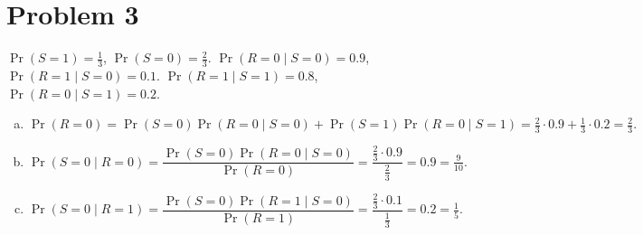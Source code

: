\section*{Problem 3}

\(\Pr(S=1)=\tfrac13\), \(\Pr(S=0)=\tfrac23\).
\(\Pr(R=0\mid S=0)=0.9\), \(\Pr(R=1\mid S=0)=0.1\).
\(\Pr(R=1\mid S=1)=0.8\), \(\Pr(R=0\mid S=1)=0.2\).

\begin{enumerate}[(a)]
\item
\[
\Pr(R=0)=\Pr(S=0)\Pr(R=0\mid S=0)+\Pr(S=1)\Pr(R=0\mid S=1)
=\tfrac23\cdot 0.9+\tfrac13\cdot 0.2=\tfrac23.
\]

\item
\[
\Pr(S=0\mid R=0)=\frac{\Pr(S=0)\Pr(R=0\mid S=0)}{\Pr(R=0)}
=\frac{\tfrac23\cdot 0.9}{\tfrac23}=0.9=\tfrac{9}{10}.
\]

\item
\[
\Pr(S=0\mid R=1)=\frac{\Pr(S=0)\Pr(R=1\mid S=0)}{\Pr(R=1)}
=\frac{\tfrac23\cdot 0.1}{\tfrac13}=0.2=\tfrac15.
\]
\end{enumerate}
